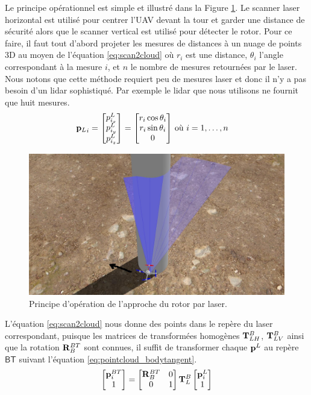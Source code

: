 Le principe opérationnel est simple et illustré dans la Figure \ref{fig:approach}. Le scanner laser horizontal est utilisé pour centrer l'UAV devant la tour et garder une distance de sécurité alors que le scanner vertical est utilisé pour détecter le rotor. Pour ce faire, il faut tout d'abord projeter les mesures de distances à un nuage de points 3D au moyen de l'équation \ref{eq:scan2cloud} où $r_i$ est une distance, $\theta_i$ l'angle correspondant à la mesure $i$, et $n$ le nombre de mesures retournées par le laser. Nous notons que cette méthode requiert peu de mesures laser et donc il n'y a pas besoin d'un lidar sophistiqué. Par exemple le lidar que nous utilisons ne fournit que huit mesures.
\begin{align}
  {\mathbf{p}_{L}}_i = \begin{bmatrix}
    p^L_{i_x} \\
    p^L_{i_y} \\
    p^L_{i_z}
  \end{bmatrix} = \begin{bmatrix}r_i \cos \theta_i \\ r_i \sin \theta_i \\ 0 \end{bmatrix} & \text{ où } i=1,\ldots,n
    \label{eq:scan2cloud}
\end{align}
\begin{figure}[htp]
  \centering
  \includegraphics[width=0.8\linewidth]{images/principe_operation.jpg}
  \caption{Principe d'opération de l'approche du rotor par laser.}
  \label{fig:approach}
\end{figure}
L'équation \ref{eq:scan2cloud} nous donne des points dans le repère du laser correspondant, puisque les matrices de transformées homogènes $\mathbf{T}_{LH}^B$, $\mathbf{T}_{LV}^B$ ainsi que la rotation $\mathbf{R}_B^{BT}$ sont connues, il suffit de transformer chaque $\mathbf{p}^L$ au repère $\mathsf{BT}$ suivant l'équation \ref{eq:pointcloud_bodytangent}.
\begin{align}
  \begin{bmatrix}\mathbf{p}^{BT}_i \\ 1\end{bmatrix} = \begin{bmatrix}
    \mathbf{R}_B^{BT} & 0 \\
    0 & 1
  \end{bmatrix} \mathbf{T}_{L}^B\begin{bmatrix}\mathbf{p}^{L}_i \\ 1\end{bmatrix}
  \label{eq:pointcloud_bodytangent}
\end{align}

